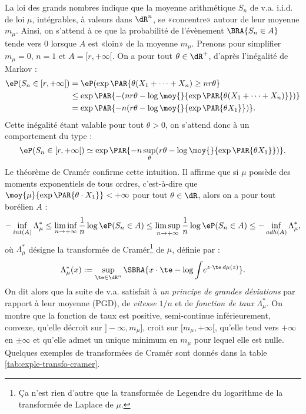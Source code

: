 La loi des grands nombres indique que la moyenne arithmétique $S_n$ de v.a.
i.i.d. de loi $\mu$, intégrables, à valeurs dans $\dR^n$, se «concentre»
autour de leur moyenne $m_\mu$. Ainsi, on s'attend à ce que la probabilité de
l'évènement $\BRA{S_n \in A}$ tende vers $0$ lorsque $A$ est «loin» de la
moyenne $m_\mu$. Prenons pour simplifier $m_\mu=0$, $n=1$ et $A=[r,+\infty[$.
On a pour tout $\theta\in\dR^+$, d'après l'inégalité de Markov :
\begin{align*}
\eP(S_n\in [r,+\infty[) 
 &= \eP(\exp\PAR{\theta (X_1+\cdots+X_n) \geq nr\theta}\\
 &\leq \exp\PAR{-(nr\theta-\log\moy{}{\exp\PAR{\theta (X_1+\cdots+X_n)}})}\\
 &= \exp\PAR{-n(r\theta-\log\moy{}{\exp\PAR{\theta X_1}})}.
\end{align*}
Cette inégalité étant valable pour tout $\theta>0$, on s'attend donc à un
comportement du type :
$$
\eP(S_n\in [r,+\infty[) \simeq 
\exp\PAR{-n\sup_\theta (r\theta-\log\moy{}{\exp\PAR{\theta X_1}})}.
$$
Le théorème de Cramér confirme cette intuition. Il affirme que si $\mu$
possède des moments exponentiels de tous ordres, c'est-à-dire que
$\moy{\mu}{\exp\PAR{\theta\cdot X_1}}<+\infty$ pour tout $\theta\in\dR$, alors
on a pour tout borélien $A$ :
$$
-\inf_{int(A)} \Lambda_\mu^*
\leq\liminf_{n\to+\infty} \frac{1}{n}\log\eP(S_n\in A)
\leq\limsup_{n\to+\infty} \frac{1}{n}\log\eP(S_n\in A)
\leq-\inf_{adh(A)} \Lambda_\mu^*,
$$
où $\Lambda_\mu^*$ désigne la transformée de Cramér\footnote{Ça n'est rien d'autre
  que la transformée de Legendre du logarithme de la transformée de Laplace de
  $\mu$.}  de $\mu$, définie par :
$$
\Lambda_\mu^*(x)
:=\sup_{\te\in\dR^n}\SBRA{x\cdot\te - \log\int\!e^{z\cdot\te\,d\mu(z)}}.
$$
On dit alors que la suite de v.a. satisfait à \emph{un principe de grandes
  déviations} par rapport à leur moyenne (PGD), de \emph{vitesse} $1/n$ et de
\emph{fonction de taux} $\Lambda_\mu^*$. On montre que la fonction de taux est
positive, semi-continue inférieurement, convexe, qu'elle décroit sur
$]-\infty,m_\mu]$, croit sur $[m_\mu,+\infty[$, qu'elle tend vers $+\infty$ en
$±\infty$ et qu'elle admet un unique minimum en $m_\mu$ pour lequel elle est
nulle. Quelques exemples de transformées de Cramér sont donnés dans la table
\ref{tab:exple-transfo-cramer}.

